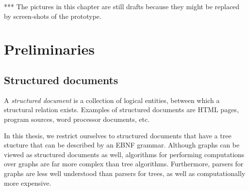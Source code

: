 







*** The pictures in this chapter are still drafts because they might be replaced by screen-shots of the prototype.\\

\section{Preliminaries}

\subsection{Structured documents} \label{sect:structdocs}



A {\em structured document} is a collection of logical entities, between which a structural relation exists. Examples of structured documents are HTML pages, program sources, word processor documents, etc. 

In this thesis, we restrict ourselves to structured documents that have a tree stucture that can be described by an EBNF grammar. Although graphs can be viewed as structured documents as well, algorithms for performing computations over graphs are far more complex than tree algorithms. Furthermore, parsers for graphs are less well understood than parsers for trees, as well as computationally more expensive. 

